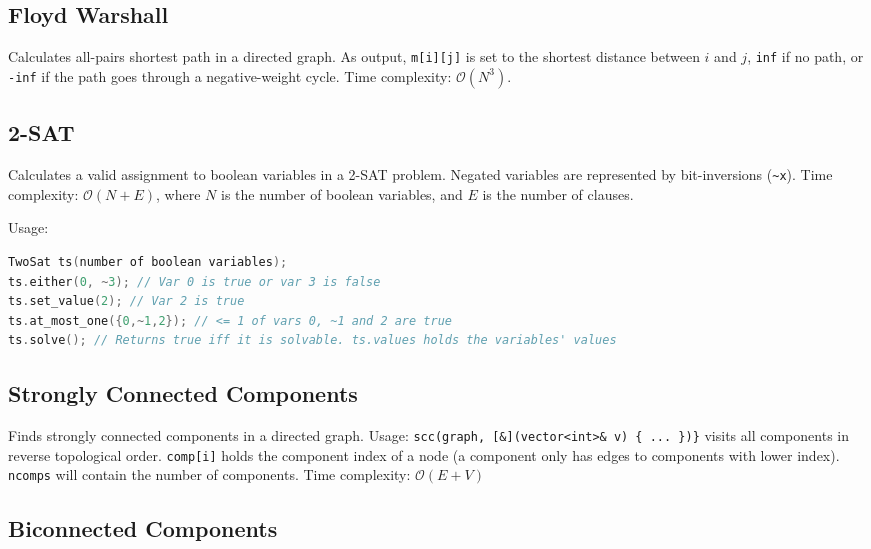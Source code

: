 \documentclass{article}
\begin{document}
\subsection*{Floyd Warshall}
Calculates all-pairs shortest path in a directed graph.
As output, \lstinline{m[i][j]} is set to the shortest distance between $i$ and $j$,
\lstinline{inf} if no path, or \lstinline{-inf} if the path goes through a negative-weight cycle.
Time complexity: $\mathcal{O}(N^3)$.



\pagebreak

\subsection*{2-SAT}

Calculates a valid assignment to boolean variables in a 2-SAT problem.
Negated variables are represented by bit-inversions (\lstinline{~x}).
Time complexity: $\mathcal{O}(N+E)$, where $N$ is the number of boolean variables, and $E$ is the number of clauses.
\begin{multicols}{2}

Usage:
\begin{lstlisting}[language=cpp]
TwoSat ts(number of boolean variables);
ts.either(0, ~3); // Var 0 is true or var 3 is false
ts.set_value(2); // Var 2 is true
ts.at_most_one({0,~1,2}); // <= 1 of vars 0, ~1 and 2 are true
ts.solve(); // Returns true iff it is solvable. ts.values holds the variables' values
\end{lstlisting}
\end{multicols}

\subsection*{Strongly Connected Components}

Finds strongly connected components in a directed graph.
Usage: \lstinline|scc(graph, [&](vector<int>& v) { ... })}| visits all components
in reverse topological order. \texttt{comp[i]} holds the component
index of a node (a component only has edges to components with
lower index). \texttt{ncomps} will contain the number of components.
Time complexity: $\mathcal{O}(E + V)$
\begin{multicols}{2}

\end{multicols}

\subsection*{Biconnected Components}
\end{document}
